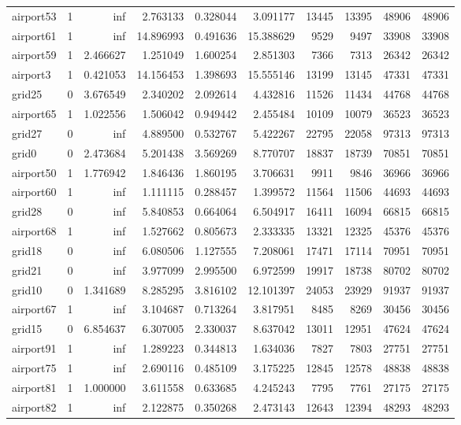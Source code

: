 \begin{longtable}{|l|r|r|r|r|r|r|r|r|r|}
airport53 & 1 & inf & 2.763133 & 0.328044 & 3.091177 & 13445 & 13395 & 48906 & 48906 \\
airport61 & 1 & inf & 14.896993 & 0.491636 & 15.388629 & 9529 & 9497 & 33908 & 33908 \\
airport59 & 1 & 2.466627 & 1.251049 & 1.600254 & 2.851303 & 7366 & 7313 & 26342 & 26342 \\
airport3 & 1 & 0.421053 & 14.156453 & 1.398693 & 15.555146 & 13199 & 13145 & 47331 & 47331 \\
grid25 & 0 & 3.676549 & 2.340202 & 2.092614 & 4.432816 & 11526 & 11434 & 44768 & 44768 \\
airport65 & 1 & 1.022556 & 1.506042 & 0.949442 & 2.455484 & 10109 & 10079 & 36523 & 36523 \\
grid27 & 0 & inf & 4.889500 & 0.532767 & 5.422267 & 22795 & 22058 & 97313 & 97313 \\
grid0 & 0 & 2.473684 & 5.201438 & 3.569269 & 8.770707 & 18837 & 18739 & 70851 & 70851 \\
airport50 & 1 & 1.776942 & 1.846436 & 1.860195 & 3.706631 & 9911 & 9846 & 36966 & 36966 \\
airport60 & 1 & inf & 1.111115 & 0.288457 & 1.399572 & 11564 & 11506 & 44693 & 44693 \\
grid28 & 0 & inf & 5.840853 & 0.664064 & 6.504917 & 16411 & 16094 & 66815 & 66815 \\
airport68 & 1 & inf & 1.527662 & 0.805673 & 2.333335 & 13321 & 12325 & 45376 & 45376 \\
grid18 & 0 & inf & 6.080506 & 1.127555 & 7.208061 & 17471 & 17114 & 70951 & 70951 \\
grid21 & 0 & inf & 3.977099 & 2.995500 & 6.972599 & 19917 & 18738 & 80702 & 80702 \\
grid10 & 0 & 1.341689 & 8.285295 & 3.816102 & 12.101397 & 24053 & 23929 & 91937 & 91937 \\
airport67 & 1 & inf & 3.104687 & 0.713264 & 3.817951 & 8485 & 8269 & 30456 & 30456 \\
grid15 & 0 & 6.854637 & 6.307005 & 2.330037 & 8.637042 & 13011 & 12951 & 47624 & 47624 \\
airport91 & 1 & inf & 1.289223 & 0.344813 & 1.634036 & 7827 & 7803 & 27751 & 27751 \\
airport75 & 1 & inf & 2.690116 & 0.485109 & 3.175225 & 12845 & 12578 & 48838 & 48838 \\
airport81 & 1 & 1.000000 & 3.611558 & 0.633685 & 4.245243 & 7795 & 7761 & 27175 & 27175 \\
airport82 & 1 & inf & 2.122875 & 0.350268 & 2.473143 & 12643 & 12394 & 48293 & 48293 \\

\end{longtable}
